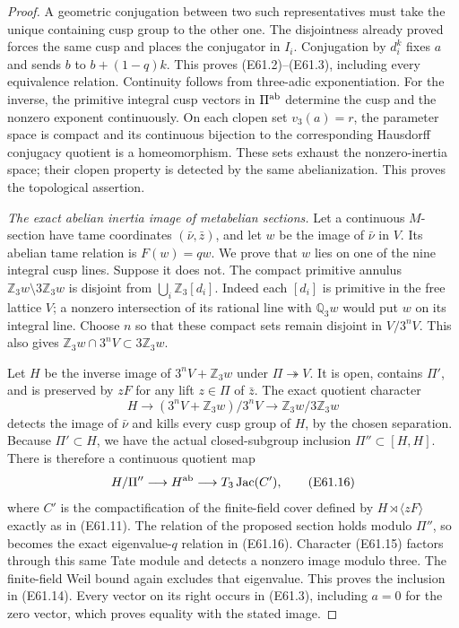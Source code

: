 \begin{proof}
A geometric conjugation between two such representatives
must take the unique containing cusp group to the other one.
The disjointness already proved forces the same cusp and
places the conjugator in $I_i$. Conjugation by $d_i^k$ fixes
$a$ and sends $b$ to $b+(1-q)k$. This proves (E61.2)--(E61.3),
including every equivalence relation. Continuity follows from
three-adic exponentiation. For the inverse, the primitive
integral cusp vectors in $\Pi^{\rm ab}$ determine the cusp
and the nonzero exponent continuously. On each clopen set
$v_3(a)=r$, the parameter space is compact and its continuous
bijection to the corresponding Hausdorff conjugacy quotient
is a homeomorphism. These sets exhaust the nonzero-inertia
space; their clopen property is detected by the same
abelianization. This proves the topological assertion.

\emph{The exact abelian inertia image of metabelian sections.}
Let a continuous $M$-section have tame coordinates
$(\bar\nu,\bar z)$, and let $w$ be the image of $\bar\nu$
in $V$. Its abelian tame relation is $F(w)=qw$. We prove
that $w$ lies on one of the nine integral cusp lines.
Suppose it does not. The compact primitive annulus
$\mathbb Z_3w\setminus3\mathbb Z_3w$ is disjoint from
$\bigcup_i\mathbb Z_3[d_i]$. Indeed each $[d_i]$ is primitive
in the free lattice $V$; a nonzero intersection of its rational
line with $\mathbb Q_3w$ would put $w$ on its integral line.
Choose $n$ so that these compact sets remain disjoint in
$V/3^nV$. This also gives
$\mathbb Z_3w\cap3^nV\subset3\mathbb Z_3w$.

Let $H$ be the inverse image of $3^nV+\mathbb Z_3w$ under
$\Pi\twoheadrightarrow V$. It is open, contains $\Pi'$, and
is preserved by $zF$ for any lift $z\in\Pi$ of $\bar z$.
The exact quotient character
\[
 H\longrightarrow
   (3^nV+\mathbb Z_3w)/3^nV
       \longrightarrow\mathbb Z_3w/3\mathbb Z_3w
 \tag{E61.15}
\]
detects the image of $\bar\nu$ and kills every cusp group of
$H$, by the chosen separation. Because $\Pi'\subset H$,
we have the actual closed-subgroup inclusion
$\Pi''\subset[H,H]$. There is therefore a continuous quotient
map
\[
 H/\Pi''\longrightarrow H^{\rm ab}
       \longrightarrow T_3\operatorname{Jac}(C'),
 \tag{E61.16}
\]
where $C'$ is the compactification of the finite-field cover
defined by $H\rtimes\langle zF\rangle$ exactly as in
(E61.11). The relation of the proposed section holds modulo
$\Pi''$, so becomes the exact eigenvalue-$q$ relation in
(E61.16). Character (E61.15) factors through this same Tate
module and detects a nonzero image modulo three. The
finite-field Weil bound again excludes that eigenvalue.
This proves the inclusion in (E61.14). Every vector on its
right occurs in (E61.3), including $a=0$ for the zero vector,
which proves equality with the stated image.


\end{proof}
